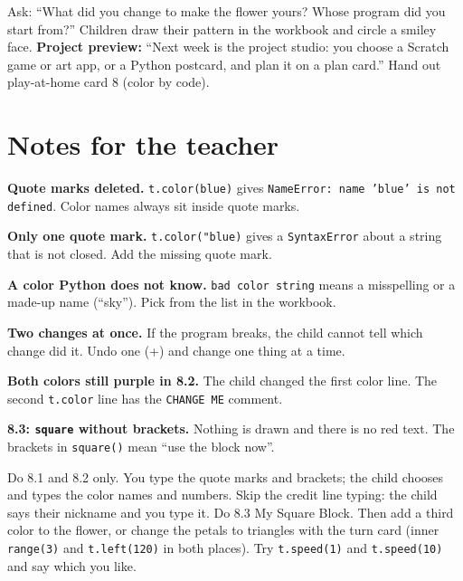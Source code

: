\begin{reflection}
Ask: \enquote{What did you change to make the flower yours? Whose program did you start from?} Children draw their pattern in the workbook and circle a smiley face. \textbf{Project preview:} \enquote{Next week is the project studio: you choose a Scratch game or art app, or a Python postcard, and plan it on a plan card.} Hand out play-at-home card 8 (color by code).
\end{reflection}

\section{Notes for the teacher}
\begin{commonmistakes}
  \item \textbf{Quote marks deleted.} \texttt{t.color(blue)} gives \texttt{NameError: name 'blue' is not defined}. Color names always sit inside quote marks.
  \item \textbf{Only one quote mark.} \texttt{t.color("blue)} gives a \texttt{SyntaxError} about a string that is not closed. Add the missing quote mark.
  \item \textbf{A color Python does not know.} \texttt{bad color string} means a misspelling or a made-up name (\enquote{sky}). Pick from the list in the workbook.
  \item \textbf{Two changes at once.} If the program breaks, the child cannot tell which change did it. Undo one (+) and change one thing at a time.
  \item \textbf{Both colors still purple in 8.2.} The child changed the first color line. The second \texttt{t.color} line has the \texttt{CHANGE ME} comment.
  \item \textbf{8.3: \texttt{square} without brackets.} Nothing is drawn and there is no red text. The brackets in \texttt{square()} mean \enquote{use the block now}.
\end{commonmistakes}

\begin{differentiation}
\supportpath Do 8.1 and 8.2 only. You type the quote marks and brackets; the child chooses and types the color names and numbers. Skip the credit line typing: the child says their nickname and you type it.
\extensionpath Do 8.3 My Square Block. Then add a third color to the flower, or change the petals to triangles with the turn card (inner \texttt{range(3)} and \texttt{t.left(120)} in both places). Try \texttt{t.speed(1)} and \texttt{t.speed(10)} and say which you like.
\end{differentiation}

